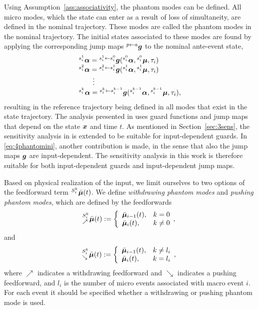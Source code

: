 \documentclass[../DC2019003Bouma.tex]{subfiles}
\begin{document}
Using Assumption~\ref{ass:associativity}, the phantom modes can be defined. All micro modes, which the state can enter as a result of loss of simultaneity, are defined in the nominal trajectory. These modes are called the phantom modes in the nominal trajectory. The initial states associated to these modes are found by applying the corresponding jump maps $\hspace{0cm}^{p\leftarrow a}{\boldsymbol{g}}$ to the nominal ante-event state,
\begin{equation}
\begin{array}{l}
\hspace{0cm}^{s_i^1}\boldsymbol{\alpha} =\hspace{0cm}^{s_i^1\leftarrow s_i^0}{\boldsymbol{g}}(\hspace{0cm}^{s_i^0}\boldsymbol{\alpha},\hspace{0cm}^{s_i^0}\boldsymbol{\mu},\tau_i)\\
\hspace{0cm}^{s_i^2}\boldsymbol{\alpha} =\hspace{0cm}^{s_i^2\leftarrow s_i^1}{\boldsymbol{g}}(\hspace{0cm}^{s_i^1}\boldsymbol{\alpha},\hspace{0cm}^{s_i^1}\boldsymbol{\mu},\tau_i)\\
\qquad\vdots\\
\hspace{0cm}^{s_i^{k}}\boldsymbol{\alpha} =\hspace{0cm}^{s_i^k\leftarrow s_i^{k-1}}{\boldsymbol{g}}(\hspace{0cm}^{s_i^{k-1}}\boldsymbol{\alpha},\hspace{0cm}^{s_i^{k-1}}\boldsymbol{\mu},\tau_i),
\end{array}\label{eq:4phantomini}
\end{equation}
resulting in the reference trajectory being defined in all modes that exist in the state trajectory. The analysis presented in \cite{Rijnen2017} uses guard functions and jump maps that depend on the state ${\boldsymbol{x}}$ and time $t$. As mentioned in Section~\ref{sec:3sens}, the sensitivity analysis in \cite{Rijnen2017} is extended to be suitable for input-dependent guards. In \eqref{eq:4phantomini}, another contribution is made, in the sense that also the jump maps ${\boldsymbol{g}}$ are input-dependent. The sensitivity analysis in this work is therefore suitable for both input-dependent guards and input-dependent jump maps. 

Based on physical realization of the input, we limit ourselves to two options of the feedforward term $\hspace{0cm}^{S^k_i}\bar{\boldsymbol{\mu}}(t)$. We define \textit{withdrawing phantom modes} and \textit{pushing phantom modes}, which are defined by the feedforwards
\begin{equation}
\hspace{0cm}^{S^k_i}_{\nearrow}\bar{\boldsymbol{\mu}}(t) := \left\lbrace\begin{array}{ll}
\bar{\boldsymbol{\mu}}_{i-1}(t), & k = 0\\
\bar{\boldsymbol{\mu}}_i(t), & k \neq 0
\end{array},\right.
\end{equation}
and
\begin{equation}
\hspace{0cm}^{S^k_i}_{\searrow}\bar{\boldsymbol{\mu}}(t) := \left\lbrace\begin{array}{ll}
\bar{\boldsymbol{\mu}}_{i-1}(t), & k \neq l_i\\
\bar{\boldsymbol{\mu}}_i(t), & k = l_i
\end{array},\right.\label{eq:4phantominp}
\end{equation}
where $\nearrow$ indicates a withdrawing feedforward and $\searrow$ indicates a pushing feedforward, and $l_i$ is the number of micro events associated with macro event $i$. For each event it should be specified whether a withdrawing or pushing phantom mode is used.
\end{document}
